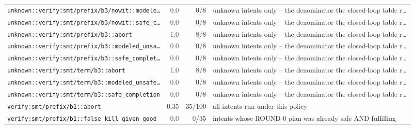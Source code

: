 \begin{center}
\begin{longtable}{@{}p{}rrp{}@{}}
\texttt{\scriptsize unknown:\allowbreak :\allowbreak verify:\allowbreak smt/\allowbreak prefix/\allowbreak b3/\allowbreak nowit:\allowbreak :\allowbreak modele…} & 0.0 & 0/8 & unknown intents only -- the denominator the closed-loop table r… \\
\texttt{\scriptsize unknown:\allowbreak :\allowbreak verify:\allowbreak smt/\allowbreak prefix/\allowbreak b3/\allowbreak nowit:\allowbreak :\allowbreak safe\_\allowbreak c…} & 0.0 & 0/8 & unknown intents only -- the denominator the closed-loop table r… \\
\texttt{\scriptsize unknown:\allowbreak :\allowbreak verify:\allowbreak smt/\allowbreak prefix/\allowbreak b3:\allowbreak :\allowbreak abort} & 1.0 & 8/8 & unknown intents only -- the denominator the closed-loop table r… \\
\texttt{\scriptsize unknown:\allowbreak :\allowbreak verify:\allowbreak smt/\allowbreak prefix/\allowbreak b3:\allowbreak :\allowbreak modeled\_\allowbreak unsa…} & 0.0 & 0/8 & unknown intents only -- the denominator the closed-loop table r… \\
\texttt{\scriptsize unknown:\allowbreak :\allowbreak verify:\allowbreak smt/\allowbreak prefix/\allowbreak b3:\allowbreak :\allowbreak safe\_\allowbreak complet…} & 0.0 & 0/8 & unknown intents only -- the denominator the closed-loop table r… \\
\texttt{\scriptsize unknown:\allowbreak :\allowbreak verify:\allowbreak smt/\allowbreak term/\allowbreak b3:\allowbreak :\allowbreak abort} & 1.0 & 8/8 & unknown intents only -- the denominator the closed-loop table r… \\
\texttt{\scriptsize unknown:\allowbreak :\allowbreak verify:\allowbreak smt/\allowbreak term/\allowbreak b3:\allowbreak :\allowbreak modeled\_\allowbreak unsafe…} & 0.0 & 0/8 & unknown intents only -- the denominator the closed-loop table r… \\
\texttt{\scriptsize unknown:\allowbreak :\allowbreak verify:\allowbreak smt/\allowbreak term/\allowbreak b3:\allowbreak :\allowbreak safe\_\allowbreak completion} & 0.0 & 0/8 & unknown intents only -- the denominator the closed-loop table r… \\
\texttt{\scriptsize verify:\allowbreak smt/\allowbreak prefix/\allowbreak b1:\allowbreak :\allowbreak abort} & 0.35 & 35/100 & all intents run under this policy \\
\texttt{\scriptsize verify:\allowbreak smt/\allowbreak prefix/\allowbreak b1:\allowbreak :\allowbreak false\_\allowbreak kill\_\allowbreak given\_\allowbreak good} & 0.0 & 0/35 & intents whose ROUND-0 plan was already safe AND fulfilling \\

\end{longtable}
\end{center}
